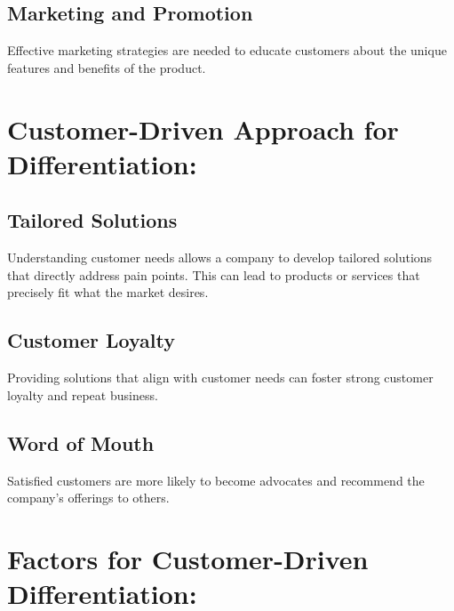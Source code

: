 \documentclass[
]{book}
\begin{document}
\hypertarget{marketing-and-promotion}{%
\subsection{Marketing and Promotion}\label{marketing-and-promotion}}

Effective marketing strategies are needed to educate customers about the unique features and benefits of the product.

\hypertarget{customer-driven-approach-for-differentiation}{%
\section{Customer-Driven Approach for Differentiation:}\label{customer-driven-approach-for-differentiation}}

\hypertarget{tailored-solutions}{%
\subsection{Tailored Solutions}\label{tailored-solutions}}

Understanding customer needs allows a company to develop tailored solutions that directly address pain points. This can lead to products or services that precisely fit what the market desires.

\hypertarget{customer-loyalty}{%
\subsection{Customer Loyalty}\label{customer-loyalty}}

Providing solutions that align with customer needs can foster strong customer loyalty and repeat business.

\hypertarget{word-of-mouth}{%
\subsection{Word of Mouth}\label{word-of-mouth}}

Satisfied customers are more likely to become advocates and recommend the company's offerings to others.

\hypertarget{factors-for-customer-driven-differentiation}{%
\section{Factors for Customer-Driven Differentiation:}\label{factors-for-customer-driven-differentiation}}
\end{document}
